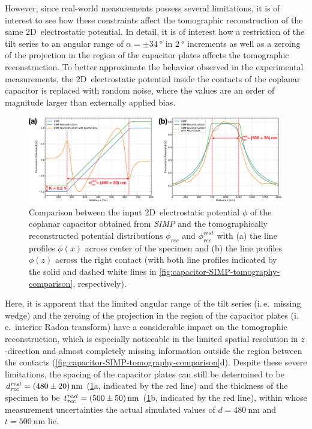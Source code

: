 However, since real-world measurements possess several limitations, it is of interest to see how these constraints affect the tomographic reconstruction of the same 2D~electrostatic potential. In detail, it is of interest how a restriction of the tilt series to an angular range of $\alpha = \pm \SI{34}{\degree}$ in $\SI{2}{\degree}$ increments as well as a zeroing of the projection in the region of the capacitor plates affects the tomographic reconstruction. To better approximate the behavior observed in the experimental measurements, the 2D~electrostatic potential inside the contacts of the coplanar capacitor is replaced with random noise, where the values are an order of magnitude larger than externally applied bias.
\begin{figure}[H]
	\centering
	\includegraphics[width=\textwidth]{Figures/Results/Capacitor/Tomography/capacitor-SIMP-tomography-linescan-comparison.pdf}
	\caption{Comparison between the input 2D~electrostatic potential $\phi$ of the coplanar capacitor obtained from \emph{SIMP} and the tomographically reconstructed potential distributions $\phi_{\mathit{rec}}$ and $\phi_{\mathit{rec}}^{\mathit{rest}}$ with (a) the line profiles $\phi\left(x\right)$ across center of the specimen and (b) the line profiles $\phi\left(z\right)$ across the right contact (with both line profiles indicated by the solid and dashed white lines in \cref{fig:capacitor-SIMP-tomography-comparison}, respectively).}
	\label{fig:capacitor-SIMP-tomography-linescan-comparison}
\end{figure}
Here, it is apparent that the limited angular range of the tilt series (i.\,e.\ missing wedge) and the zeroing of the projection in the region of the capacitor plates (i.\,e.\ interior Radon transform) have a considerable impact on the tomographic reconstruction, which is especially noticeable in the limited spatial resolution in $z$-direction and almost completely missing information outside the region between the contacts (\cref{fig:capacitor-SIMP-tomography-comparison}d). Despite these severe limitations, the spacing of the capacitor plates can still be determined to be $d_{\mathit{rec}}^{\mathit{rest}} = \SI{480 \pm 20}{\nm}$ (\cref{fig:capacitor-SIMP-tomography-linescan-comparison}a, indicated by the red line) and the thickness of the specimen to be $t_{\mathit{rec}}^{\mathit{rest}} = \SI{500 \pm 50}{\nm}$ (\cref{fig:capacitor-SIMP-tomography-linescan-comparison}b, indicated by the red line), within whose measurement uncertainties the actual simulated values of $d = \SI{480}{\nm}$ and $t = \SI{500}{\nm}$ lie.


